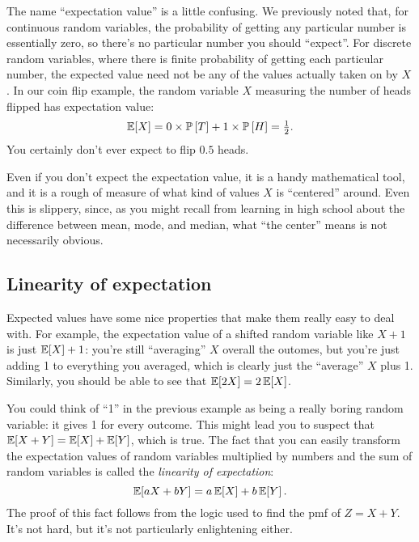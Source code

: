 The name ``expectation value'' is a little confusing. We previously noted that,
for continuous random variables, the probability of getting any particular
number is essentially zero, so there's no particular number you should
``expect''. For discrete random variables, where there is finite probability
of getting each particular number, the expected value need not be any of the
values actually taken on by $X$. In our coin flip example, the random variable
$X$ measuring the number of heads flipped has expectation value:
\begin{equation}
\mathbb{E}\!\left[{X}\right] = 0 \times \mathbb{P}\left[{T}\right] + 1 \times \mathbb{P}\left[{H}\right] = \tfrac{1}{2}.
\end{equation}
You certainly don't ever expect to flip $0.5$ heads.

Even if you don't expect the expectation value, it is a handy mathematical
tool, and it is a rough of measure of what kind of values $X$ is
``centered'' around. Even this is slippery, since, as you might
recall from learning in high school about the difference between mean, mode, and median, what ``the
center'' means is not necessarily obvious.

\subsection{Linearity of expectation}

Expected values have some nice properties that make them really easy to deal
with. For example, the expectation value of a shifted random variable like $X +
1$ is just $\mathbb{E}\!\left[{X}\right] + 1$: you're still ``averaging'' $X$ overall the
outomes, but you're just adding 1 to everything you averaged, which is clearly
just the ``average'' $X$ plus 1. Similarly, you should be able to see that
$\mathbb{E}\!\left[{2X}\right] = 2 \,\mathbb{E}\!\left[{X}\right]$.

You could think of ``1'' in the previous example as being a really boring
random variable: it gives 1 for every outcome. This might lead you to suspect
that $\mathbb{E}\!\left[{X + Y}\right] = \mathbb{E}\!\left[{X}\right] + \mathbb{E}\!\left[{Y}\right]$, which is true. The fact that
you can easily transform the expectation values of random variables multiplied by
numbers and the sum of random variables is called the \emph{linearity of expectation}:
\begin{equation}
\mathbb{E}\!\left[{aX + bY}\right] = a \,\mathbb{E}\!\left[{X}\right] + b \,\mathbb{E}\!\left[{Y}\right].
\end{equation}
The proof of this fact follows from the logic used to find the pmf of $Z = X +
Y$. It's not hard, but it's not particularly enlightening either.

